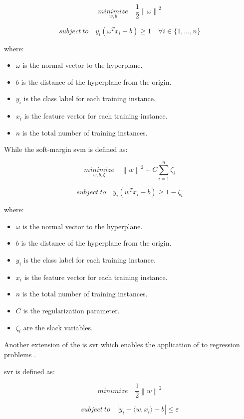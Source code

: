     $$\underset{w, b}{minimize}\quad \frac{1}{2}\left\| \omega \right\|^2$$

    $$subject\ to\quad y_{i}(\omega^Tx_{i}-b) \ge 1\quad \forall i \in \{1,...,n\}$$

    where:
    \begin{itemize}
        \item $\omega$ is the normal vector to the hyperplane.
        \item $b$ is the distance of the hyperplane from the origin.
        \item $y_{i}$ is the class label for each training instance.
        \item $x_{i}$ is the feature vector for each training instance.
        \item $n$ is the total number of training instances.
    \end{itemize}

While the soft-margin \gls{svm} is defined as:

    $$\underset{w, b, \zeta}{minimize}\quad \left\| w \right\|^2 + C\sum_{i=1}^{n}\zeta_{i}$$

    $$subject\ to\quad y_{i}(w^Tx_{i}-b) \ge 1 - \zeta_{i}$$

    where:
    \begin{itemize}
        \item $\omega$ is the normal vector to the hyperplane.
        \item $b$ is the distance of the hyperplane from the origin.
        \item $y_{i}$ is the class label for each training instance.
        \item $x_{i}$ is the feature vector for each training instance.
        \item $n$ is the total number of training instances.
        \item $C$ is the regularization parameter.
        \item $\zeta_{i}$ are the slack variables.
    \end{itemize}

Another extension of the  is \gls{svr} which enables the application of  to regression problems \cite{vapnik-svr,svr}.

\gls{svr} is defined as:

    $$minimize\quad \frac{1}{2} \left\| w \right\|^2$$

    $$subject\ to\quad \left| y_{i} - \langle w,x_{i} \rangle - b \right| \le \varepsilon$$

